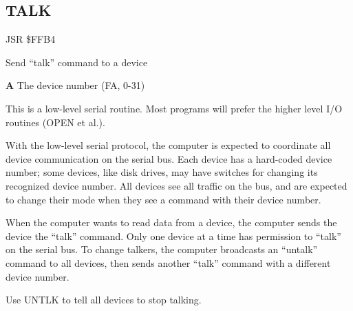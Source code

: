 \newpage
\subsection{TALK}
\label{KERNAL Jump Table!TALK}
\begin{description}[leftmargin=2cm,style=nextline]
    \item [Address:] JSR \$FFB4
    \item [Description:] Send ``talk'' command to a device
    \item [Inputs:]
        \textbf{A} The device number (FA, 0-31)
    \item [Remarks:]
        This is a low-level serial routine. Most programs will prefer the higher level I/O routines (OPEN et al.).

        With the low-level serial protocol, the computer is expected to coordinate all device communication on the serial bus. Each device has a hard-coded device number; some devices, like disk drives, may have switches for changing its recognized device number. All devices see all traffic on the bus, and are expected to change their mode when they see a command with their device number.

        When the computer wants to read data from a device, the computer sends the device the ``talk'' command. Only one device at a time has permission to ``talk'' on the serial bus. To change talkers, the computer broadcasts an ``untalk'' command to all devices, then sends another ``talk'' command with a different device number.

        Use UNTLK to tell all devices to stop talking.
    \item [Example:]
\end{description}



\newpage
